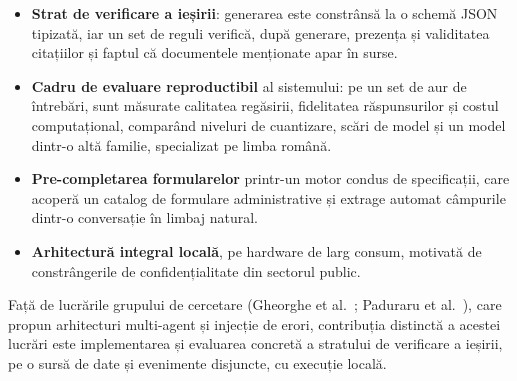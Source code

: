 \begin{itemize}
    \item \textbf{Strat de verificare a ieșirii}: generarea este constrânsă la o schemă JSON tipizată, iar un set de reguli verifică, după generare, prezența și validitatea citațiilor și faptul că documentele menționate apar în surse.
    \item \textbf{Cadru de evaluare reproductibil} al sistemului: pe un set de aur de întrebări, sunt măsurate calitatea regăsirii, fidelitatea răspunsurilor și costul computațional, comparând niveluri de cuantizare, scări de model și un model dintr-o altă familie, specializat pe limba română.
    \item \textbf{Pre-completarea formularelor} printr-un motor condus de specificații, care acoperă un catalog de formulare administrative și extrage automat câmpurile dintr-o conversație în limbaj natural.
    \item \textbf{Arhitectură integral locală}, pe hardware de larg consum, motivată de constrângerile de confidențialitate din sectorul public.
\end{itemize}

Față de lucrările grupului de cercetare (Gheorghe et al.\ \cite{gheorghe2026robust}; Paduraru et al.\ \cite{paduraru2026guardrail}), care propun arhitecturi multi-agent și injecție de erori, contribuția distinctă a acestei lucrări este implementarea și evaluarea concretă a stratului de verificare a ieșirii, pe o sursă de date și evenimente disjuncte, cu execuție locală.
